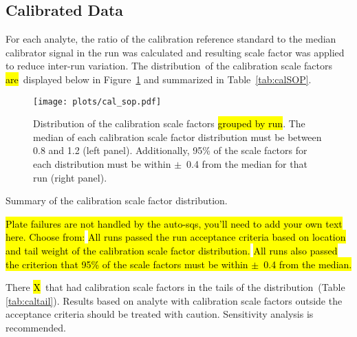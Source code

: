 \documentclass[11pt]{article}
\newif\ifincludeCalSop  %
\newif\ifCalFails      %
\newcommand{\Plural}{}
\newcommand{\IsAre}{\hl{are}}
\newcommand{\NumCalFail}{\hl{X}}
\begin{document}
\subsection{Calibrated Data} \label{sec:cal}



\ifincludeCalSop

For each analyte, the ratio of the calibration reference standard to the median
calibrator signal in the run was calculated and resulting scale factor was
applied to reduce inter-run variation. The distribution\Plural~of the
calibration scale factors \IsAre~displayed below in Figure~\ref{fig:calSOP} and
summarized in Table~\ref{tab:calSOP}. 


\begin{figure}[H]
  \centering
  \texttt{[image: plots/cal\_sop.pdf]}
  \caption{Distribution of the calibration scale factors \hl{grouped by run}.
    The median of each calibration scale factor distribution must be between 0.8
    and 1.2 (left panel). Additionally, 95\% of the scale factors for each
    distribution must be within $\pm$~0.4 from the median for that run (right
    panel).}
  \label{fig:calSOP}
\end{figure}


\begin{table}[ht!]
  \begin{center}
    
    \caption{Summary of the calibration scale factor distribution\Plural.}
    \label{tab:calSOP}
  \end{center}
\end{table}

  \hl{Plate failures are not handled by the auto-sqs, you'll need to add your
      own text here. Choose from:}
  \hl{All runs passed the run acceptance criteria based on location and tail
      weight of the calibration scale factor distribution.}
  \hl{All runs also passed the criterion that 95\% of the scale factors must be
      within $\pm$~0.4 from the median.}

\ifCalFails

There \NumCalFail~that had calibration scale factors in the tails of the
distribution\Plural~(Table \ref{tab:caltail}).  Results based on analyte with
calibration scale factors outside the acceptance criteria should be treated
with caution.  Sensitivity analysis is recommended.
  
\end{document}
